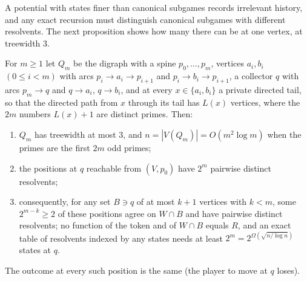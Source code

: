\documentclass[final]{siamart0516}
\numberwithin{theorem}{section}
\numberwithin{equation}{section}
\theoremstyle{siamnonum}
\theoremstyle{plain}
\begin{document}
A potential with states finer than canonical subgames records irrelevant history, and any exact recursion must distinguish canonical subgames with different resolvents. The next proposition shows how many there can be at one vertex, at treewidth $3$.

\begin{proposition}[memory]\label{prop:memory}
For $m\ge1$ let $Q_m$ be the digraph with a spine $p_0,\dots,p_m$, vertices $a_i,b_i$ $(0\le i<m)$ with arcs $p_i\to a_i\to p_{i+1}$ and $p_i\to b_i\to p_{i+1}$, a collector $q$ with arcs $p_m\to q$ and $q\to a_i$, $q\to b_i$, and at every $x\in\{a_i,b_i\}$ a private directed tail, so that the directed path from $x$ through its tail has $L(x)$ vertices, where the $2m$ numbers $L(x)+1$ are distinct primes. Then:
\begin{enumerate}[label=\textup{(\arabic*)}]
\item $Q_m$ has treewidth at most $3$, and $n=|V(Q_m)|=O(m^{2}\log m)$ when the primes are the first $2m$ odd primes;
\item the positions at $q$ reachable from $(V,p_0)$ have $2^{m}$ pairwise distinct resolvents;
\item consequently, for any set $B\ni q$ of at most $k+1$ vertices with $k<m$, some $2^{m-k}\ge2$ of these positions agree on $W\cap B$ and have pairwise distinct resolvents; no function of the token and of $W\cap B$ equals $R$, and an exact table of resolvents indexed by any states needs at least $2^{m}=2^{\Omega(\sqrt{n/\log n})}$ states at $q$.
\end{enumerate}
The outcome at every such position is the same \textup{(}the player to move at $q$ loses\textup{)}.
\end{proposition}
\end{document}
